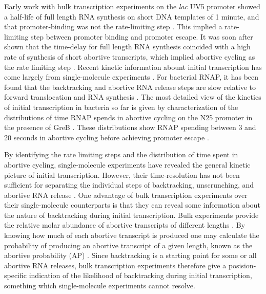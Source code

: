 Early work with bulk transcription experiments on the \textit{lac} UV5
promoter showed a half-life of full length RNA synthesis on short DNA
templates of 1 minute, and that promoter-binding was not the rate-limiting
step \cite{stefano_lac_1979}. This implied a rate-limiting step between
promoter binding and promoter escape. It was soon after shown that the
time-delay for full length RNA synthesis coincided with a high rate of
synthesis of short abortive transcripts, which implied abortive cycling as the
rate limiting step \cite{munson_abortive_1981}. Recent kinetic information
abount initial transcription has come largely from single-molecule experiments
\cite{revyakin_abortive_2006, kapanidis_initial_2006, tang_real-time_2009,
kapanidis_retention_2005, margeat_direct_2006}. For bacterial RNAP, it has
been found that the backtracking and abortive RNA release steps are slow
relative to forward translocation and RNA synthesis
\cite{revyakin_abortive_2006, margeat_direct_2006}. The most detailed view of
the kinetics of initial transcription in bacteria so far is given by
characterization of the distributions of time RNAP spends in abortive cycling
on the N25 promoter in the presence of GreB \cite{revyakin_abortive_2006}.
These distributions show RNAP spending between 3 and 20 seconds in abortive
cycling before achieving promoter escape \cite{revyakin_abortive_2006}.

By identifying the rate limiting steps and the distribution of time spent in
abortive cycling, single-molecule experiments have revealed the general
kinetic picture of initial transcription. However, their time-resolution has
not been sufficient for separating the individual steps of backtracking,
unscrunching, and abortive RNA release \cite{revyakin_abortive_2006,
margeat_direct_2006}. One advantage of bulk transcription experiments over
their single-molecule counterparts is that they can reveal some information
about the nature of backtracking during initial transcription. Bulk
experiments provide the relative molar abundance of abortive transcripts of
different lengths \cite{hsu_monitoring_2009}. By knowing how much of each
abortive transcript is produced one may calculate the probability of producing
an abortive transcript of a given length, known as the abortive probability
(AP) \cite{hsu_promoter_2002, hsu_quantitative_1996}. Since backtracking is a
starting point for some or all abortive RNA releases, bulk transcription
experiments therefore give a posision-specific indication of the likelihood of
backtracking during initial transcription, something which single-molecule
experiments cannot resolve.

